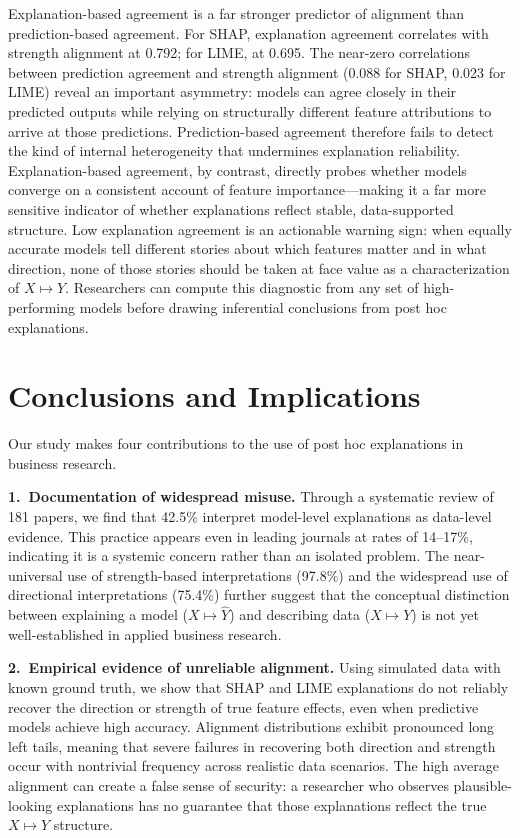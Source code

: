 \documentclass[11pt]{article}
\begin{document}
Explanation-based agreement is a far stronger predictor of alignment than prediction-based agreement. For SHAP, explanation agreement correlates with strength alignment at 0.792; for LIME, at 0.695. The near-zero correlations between prediction agreement and strength alignment (0.088 for SHAP, 0.023 for LIME) reveal an important asymmetry: models can agree closely in their predicted outputs while relying on structurally different feature attributions to arrive at those predictions. Prediction-based agreement therefore fails to detect the kind of internal heterogeneity that undermines explanation reliability. Explanation-based agreement, by contrast, directly probes whether models converge on a consistent account of feature importance---making it a far more sensitive indicator of whether explanations reflect stable, data-supported structure. Low explanation agreement is an actionable warning sign: when equally accurate models tell different stories about which features matter and in what direction, none of those stories should be taken at face value as a characterization of $X \mapsto Y$. Researchers can compute this diagnostic from any set of high-performing models before drawing inferential conclusions from post hoc explanations.

\section{Conclusions and Implications}

Our study makes four contributions to the use of post hoc explanations in business research.

\noindent\textbf{1.\ Documentation of widespread misuse.} Through a systematic review of 181 papers, we find that 42.5\% interpret model-level explanations as data-level evidence. This practice appears even in leading journals at rates of 14--17\%, indicating it is a systemic concern rather than an isolated problem. The near-universal use of strength-based interpretations (97.8\%) and the widespread use of directional interpretations (75.4\%) further suggest that the conceptual distinction between explaining a model ($X \mapsto \hat{Y}$) and describing data ($X \mapsto Y$) is not yet well-established in applied business research.

\noindent\textbf{2.\ Empirical evidence of unreliable alignment.} Using simulated data with known ground truth, we show that SHAP and LIME explanations do not reliably recover the direction or strength of true feature effects, even when predictive models achieve high accuracy. Alignment distributions exhibit pronounced long left tails, meaning that severe failures in recovering both direction and strength occur with nontrivial frequency across realistic data scenarios. The high average alignment can create a false sense of security: a researcher who observes plausible-looking explanations has no guarantee that those explanations reflect the true $X \mapsto Y$ structure.
\end{document}
